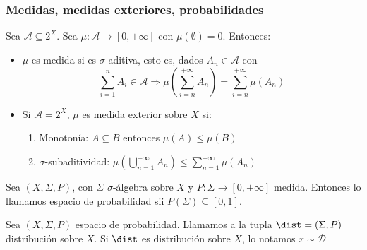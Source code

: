  \begin{frame}\frametitle{Medidas, medidas exteriores, probabilidades}
 \begin{definition}
  Sea $\mathcal{A} \subseteq 2^X$. Sea $\mu: \mathcal{A} \rightarrow [0, +\infty]$ con $\mu(\emptyset) = 0$. Entonces:
  
  \begin{itemize}
   \item $\mu$ es medida si es $\sigma$-aditiva, esto es, dados $A_n \in \mathcal{A}$ con 
   \[
    \sum_{i=1}^n A_i \in \mathcal{A} \Rightarrow \mu\left(\sum_{i=n}^{+\infty} A_n \right)= \sum_{i=n}^{+\infty} \mu(A_n)
   \]
  
   \item Si $\mathcal{A}=2^X$, $\mu$ es medida exterior sobre $X$ si:
  
    \begin{enumerate}[i]
     \item Monotonía: $A\subseteq B$ entonces $\mu(A) \le \mu(B)$
     \item $\sigma$-subaditividad: $\mu \left(\bigcup_{n=1}^{+\infty} A_n \right) \le \sum_{n=1}^{+\infty} \mu (A_n)$
    \end{enumerate}
  \end{itemize}
 \end{definition}

 \vspace{-1em}
 \begin{definition}
  Sea $(X, \Sigma, P)$, con $\Sigma$ $\sigma$-álgebra sobre $X$ y $P:\Sigma \rightarrow [0, +\infty]$ medida. 
  Entonces lo llamamos espacio de probabilidad sii $P(\Sigma)\subseteq [0,1]$.
 \end{definition}
 
 \begin{definition}
  Sea $(X, \Sigma, P)$ espacio de probabilidad. Llamamos a la tupla $\dist = (\Sigma,P)$ distribución sobre $X$. 
  Si $\dist$ es distribución sobre $X$, lo notamos $x\sim \mathcal{D}$
 \end{definition}
 \end{frame}
 
